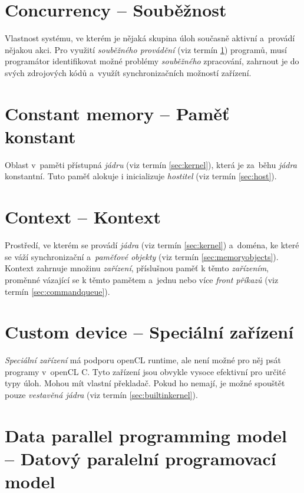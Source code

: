 \section{Concurrency -- Souběžnost}
\label{sec:concurrency}

Vlastnost systému, ve kterém je nějaká skupina úloh současně aktivní a~provádí nějakou akci. Pro využití \emph{souběžného provádění} (viz termín \ref{sec:concurrency}) programů, musí programátor
identifikovat možné problémy \emph{souběžného} zpracování, zahrnout je do svých zdrojových
kódů a~využít synchronizačních možností zařízení.

\section{Constant memory -- Paměť konstant}
\label{sec:constantmemory}
Oblast v~paměti přístupná \emph{jádru} (viz termín \ref{sec:kernel}), která je za~běhu \emph{jádra} konstantní. Tuto paměť alokuje i inicializuje 
\emph{hostitel} (viz termín \ref{sec:host}).

\section{Context -- Kontext}
\label{sec:context}

Prostředí, ve kterém se provádí \emph{jádra} (viz termín \ref{sec:kernel}) a~doména,
ke které se váží synchronizační a~\emph{paměťové objekty} (viz termín \ref{sec:memoryobjects}).
Kontext zahrnuje množinu \emph{zařízení}, příslušnou paměť
k těmto \emph{zařízením}, proměnné vázající se k těmto pamětem a~jednu nebo více \emph{front příkazů} (viz termín \ref{sec:commandqueue}).

\section{Custom device -- Speciální zařízení}
\label{sec:customdevice}

\emph{Speciální zařízení} má podporu openCL runtime, ale není možné pro něj psát programy v~openCL C.
Tyto zařízení jsou obvykle vysoce efektivní pro
určité typy úloh. Mohou mít vlastní překladač.
Pokud ho nemají, je možné spouštět pouze
\emph{vestavěná jádra} (viz termín \ref{sec:builtinkernel}).

\section{Data parallel programming model
-- Datový paralelní programovací model}
\label{sec:dataparallelprogrammingmodel}

